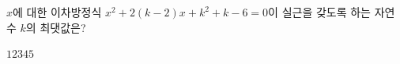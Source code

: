 $x$에 대한 이차방정식 $x^2+2(k-2)x+k^2+k-6=0$이 실근을 갖도록 하는 자연수 $k$의 최댓값은?
\begin{choices32}{$1$}{$2$}{$3$}{$4$}{$5$}\end{choices32}

